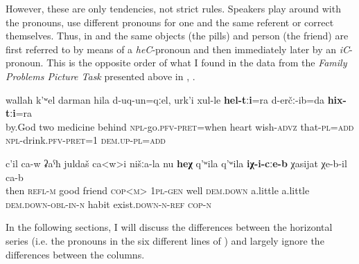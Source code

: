 However, these are only tendencies, not strict rules. Speakers play around with the pronouns, use different pronouns for one and the same referent or correct themselves. Thus, in  and  the same objects (the pills) and person (the friend) are first referred to by means of a \textit{heC}-pronoun and then immediately later by an \textit{iC}-pronoun. This is the opposite order of what I found in the data from the \textit{Family Problems Picture Task} presented above in , .

\begin{exe}
	\ex	\label{By God, when two pills (i.e. medicines) were left behind, (I) also}
	\gll	wallah	k'ʷel	darman	hila	d-uq-un=qːel,	urk'i	xul-le	\textbf{hel-tːi}=ra	d-erčː-ib=da	\textbf{hix-tːi}=ra \\
		by.God two medicine behind \textsc{npl}-go.\textsc{pfv-pret}=when heart	wish-\textsc{advz} that-\textsc{pl}=\textsc{add} \textsc{npl}-drink.\textsc{pfv}-\textsc{pret}=1 \textsc{dem.up-pl}=\textsc{add}\\
	\glt	{}
	
	 \label{He is our good friend, but he has a bit this habit}
	\sn
	\gll	c'il	ca-w	ʡaˁħ	juldaš	ca<w>i	nišːa-la	nu	\textbf{heχ}	q'ʷila	q'ʷila	\textbf{iχ-i-cːe-b}	χasijat	χe-b-il	ca-b\\
		then	\textsc{refl-m}	good	friend	\textsc{cop<m>}	\textsc{1pl}-\textsc{gen}	well		\textsc{dem.down}	a.little	a.little	\textsc{dem.down}-\textsc{obl-in}-\textsc{n}	habit	exist.\textsc{down}-\textsc{n}-\textsc{ref}	\textsc{cop-n}\\
	\glt	{}
\end{exe}

In the following sections, I will discuss the differences between the horizontal series (i.e. the pronouns in the six different lines of ) and largely ignore the differences between the columns.


